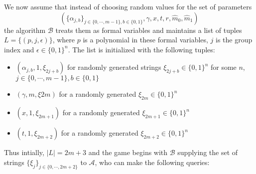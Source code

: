 \noindent We now assume that instead of choosing random values for the set of parameters 
\begin{equation}
 (\{\alpha_{j,b}\}_{j\in\{0,\cdots,m-1\},b\in\{0,1\}},\gamma,x,t,r,\hat{m}_0,\hat{m}_1)\nonumber
\end{equation}
\noindent the algorithm $\mathcal{B}$ treats them as formal variables and maintains a list of tuples $L=\{(p,j,\epsilon)\}$, where $p$ is a polynomial in these formal variables, $j$ is the group index and $\epsilon\in\{0,1\}^{n}$. The list is initialized with the following tuples:
\begin{itemize}
 \item $(\alpha_{j,b},1,\xi_{2j+b})$ for randomly generated strings $\xi_{2j+b}\in\{0,1\}^{n}$ for some $n$, $j\in\{0,\cdots,m-1\},b\in\{0,1\}$
 \item $(\gamma,m,\xi{2m})$ for a randomly generated $\xi_{2m}\in\{0,1\}^{n}$
 \item $(x,1,\xi_{2m+1})$ for a randomly generated $\xi_{2m+1}\in\{0,1\}^{n}$
 \item $(t,1,\xi_{2m+2})$ for a randomly generated $\xi_{2m+2}\in\{0,1\}^{n}$
\end{itemize}

\noindent Thus intially, $|L|=2m+3$ and the game begins with $\mathcal{B}$ supplying the set of strings $\{\xi_j\}_{j\in\{0,\cdots,2m+2\}}$ to $\mathcal{A}$, who can make the following queries: 

